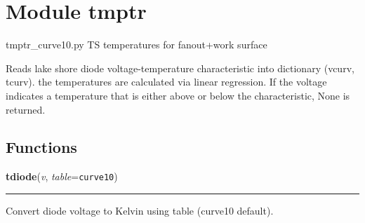 %
%
%


\section{Module tmptr}

    \label{tmptr}
tmptr\_curve10.py  TS temperatures for fanout+work surface

Reads lake shore diode voltage-temperature characteristic into dictionary 
(vcurv, tcurv).  the temperatures are calculated via linear regression. If 
the voltage indicates a temperature that is either above or below the 
characteristic, None is returned.



  \subsection{Functions}

    \label{tmptr:tdiode}

    \vspace{0.5ex}

    \begin{boxedminipage}{\textwidth}

    \raggedright \textbf{tdiode}(\textit{v}, \textit{table}=\texttt{curve10})

    \vspace{-1.5ex}

    \rule{\textwidth}{0.5\fboxrule}
    Convert diode voltage to Kelvin using table (curve10 default).

    \vspace{1ex}

    \end{boxedminipage}



